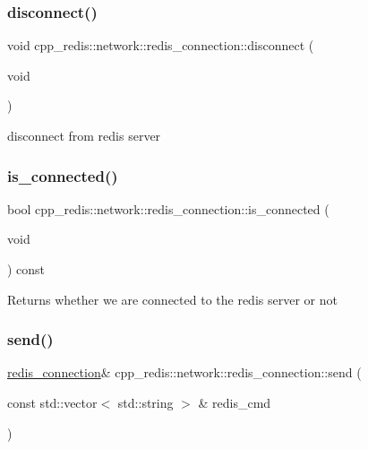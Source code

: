 \subsubsection{\texorpdfstring{disconnect()}{disconnect()}}
{\footnotesize\ttfamily void cpp\+\_\+redis\+::network\+::redis\+\_\+connection\+::disconnect (\begin{DoxyParamCaption}\item[{void}]{ }\end{DoxyParamCaption})}

disconnect from redis server \mbox{\label{classcpp__redis_1_1network_1_1redis__connection_ad3d96826e2e67fb3fed23280237d4d9c}} 
\subsubsection{\texorpdfstring{is\+\_\+connected()}{is\_connected()}}
{\footnotesize\ttfamily bool cpp\+\_\+redis\+::network\+::redis\+\_\+connection\+::is\+\_\+connected (\begin{DoxyParamCaption}\item[{void}]{ }\end{DoxyParamCaption}) const}

\begin{DoxyReturn}{Returns}
whether we are connected to the redis server or not 
\end{DoxyReturn}
\mbox{\label{classcpp__redis_1_1network_1_1redis__connection_a98c163ce431e85e46e139211564b7b3f}} 
\subsubsection{\texorpdfstring{send()}{send()}}
{\footnotesize\ttfamily \hyperlink{classcpp__redis_1_1network_1_1redis__connection}{redis\+\_\+connection}\& cpp\+\_\+redis\+::network\+::redis\+\_\+connection\+::send (\begin{DoxyParamCaption}\item[{const std\+::vector$<$ std\+::string $>$ \&}]{redis\+\_\+cmd }\end{DoxyParamCaption})}

